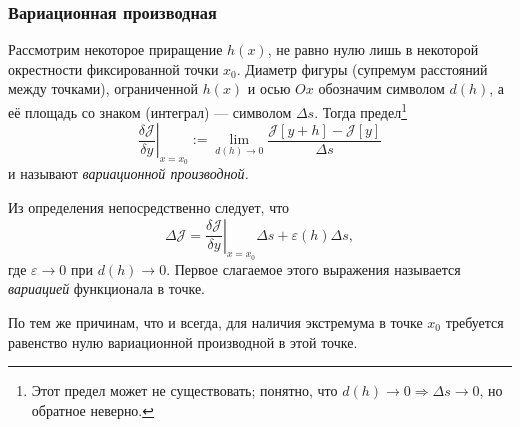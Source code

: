 \subsubsection{Вариационная производная}
\begin{definition}
  Рассмотрим некоторое приращение $ h(x) $, не равно нулю лишь в некоторой
  окрестности фиксированной точки $ x_0 $. Диаметр фигуры (супремум расстояний
  между точками), ограниченной $ h(x) $ и осью $ Ox $ обозначим символом $ d(h)
  $, а её площадь со знаком (интеграл) --- символом $ \Delta s $. Тогда
  предел\footnote{Этот предел может не существовать; понятно, что $ d(h) \to 0
  \Rightarrow \Delta s \to 0 $, но обратное неверно.} \[ \left.\frac{\delta
      \mathscr J}{\delta y}\right|_{x=x_0}:=\lim_{d(h) \to 0} \frac{\mathscr J[y
      + h] - \mathscr J[y]}{\Delta s} \] и называют \emph{вариационной
      производной.} 
\end{definition}

Из определения непосредственно следует, что 
\[
  \Delta \mathscr J = \left. \frac{\delta \mathscr J}{\delta y}\right|_{x=x_0}
    \Delta s + \varepsilon(h) \Delta s,
\]
где $ \varepsilon \to 0$ при $ d(h) \to 0 $. Первое слагаемое
этого выражения называется \emph{вариацией} функционала в точке.

По тем же причинам, что и всегда, для наличия экстремума в точке $ x_0 $
требуется равенство нулю вариационной производной в этой точке.

